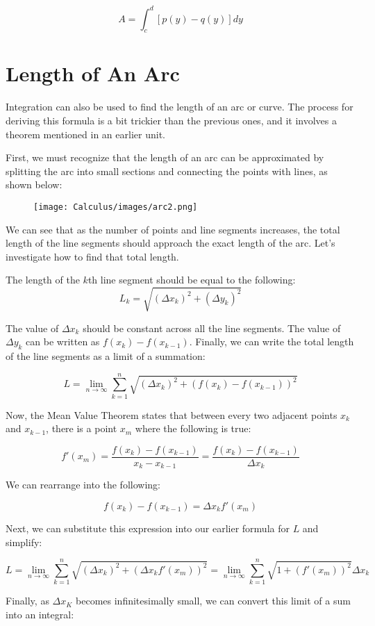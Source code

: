 \documentclass[11pt]{article}
\begin{document}
\[ A = \int_{c}^{d}[p(y)-q(y)]dy \]

\section{Length of An Arc}
Integration can also be used to find the length of an arc or curve. The process for deriving this formula is a bit trickier than the previous ones, and it involves a theorem mentioned in an earlier unit.

First, we must recognize that the length of an arc can be approximated by splitting the arc into small sections and connecting the points with lines, as shown below:

\begin{figure}[h]
    \centering
    \texttt{[image: Calculus/images/arc2.png]}
\end{figure}

We can see that as the number of points and line segments increases, the total length of the line segments should approach the exact length of the arc. Let's investigate how to find that total length.

The length of the $k$th line segment should be equal to the following:
\[ L_k = \sqrt{(\Delta x_k)^2 + (\Delta y_k)^2}\]

The value of $\Delta x_k$ should be constant across all the line segments. The value of $\Delta y_k$ can be written as $f(x_k)-f(x_{k-1})$. Finally, we can write the total length of the line segments as a limit of a summation:

\[ L = \lim_{n \to \infty} \sum_{k=1}^n \sqrt{(\Delta x_k)^2 + (f(x_k)-f(x_{k-1}))^2}\]

Now, the Mean Value Theorem states that between every two adjacent points $x_k$ and $x_{k-1}$, there is a point $x_m$ where the following is true:

\[ f'(x_m) = \frac{f(x_k)-f(x_{k-1})}{x_k-x_{k-1}} = \frac{f(x_k)-f(x_{k-1})}{\Delta x_k}\]

We can rearrange into the following:

\[ f(x_k)-f(x_{k-1}) = \Delta x_k f'(x_m) \]

Next, we can substitute this expression into our earlier formula for $L$ and simplify:

\[ L = \lim_{n \to \infty} \sum_{k=1}^n \sqrt{(\Delta x_k)^2 + (\Delta x_k f'(x_m))^2} = \lim_{n \to \infty} \sum_{k=1}^n \sqrt{1 + ( f'(x_m))^2} \Delta x_k\]

Finally, as $\Delta x_K$ becomes infinitesimally small, we can convert this limit of a sum into an integral:
\end{document}
